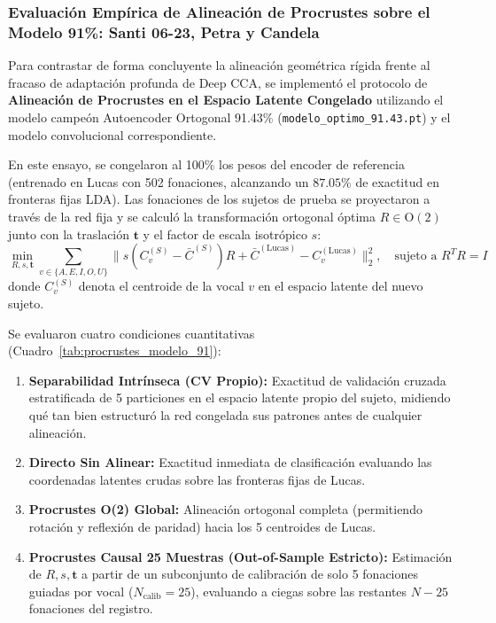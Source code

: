 \documentclass[11pt,a4paper]{article}
\begin{document}
\subsubsection{Evaluación Empírica de Alineación de Procrustes sobre el Modelo 91\%: Santi 06-23, Petra y Candela}
\label{subsubsec:evaluacion_procrustes_modelo_91}

Para contrastar de forma concluyente la alineación geométrica rígida frente al fracaso de adaptación profunda de Deep CCA, se implementó el protocolo de \textbf{Alineación de Procrustes en el Espacio Latente Congelado} utilizando el modelo campeón Autoencoder Ortogonal 91.43\% (\texttt{modelo\_optimo\_91.43.pt}) y el modelo convolucional correspondiente. 

En este ensayo, se congelaron al 100\% los pesos del encoder de referencia (entrenado en Lucas con 502 fonaciones, alcanzando un $87.05\%$ de exactitud en fronteras fijas LDA). Las fonaciones de los sujetos de prueba se proyectaron a través de la red fija y se calculó la transformación ortogonal óptima $R \in \text{O}(2)$ junto con la traslación $\mathbf{t}$ y el factor de escala isotrópico $s$:
\begin{equation}
    \min_{R, s, \mathbf{t}} \sum_{v \in \{A,E,I,O,U\}} \| s (C_v^{(S)} - \bar{C}^{(S)}) R + \bar{C}^{(\text{Lucas})} - C_v^{(\text{Lucas})} \|_2^2, \quad \text{sujeto a } R^T R = I
\end{equation}
donde $C_v^{(S)}$ denota el centroide de la vocal $v$ en el espacio latente del nuevo sujeto.

Se evaluaron cuatro condiciones cuantitativas (Cuadro~\ref{tab:procrustes_modelo_91}):
\begin{enumerate}
    \item \textbf{Separabilidad Intrínseca (CV Propio):} Exactitud de validación cruzada estratificada de 5 particiones en el espacio latente propio del sujeto, midiendo qué tan bien estructuró la red congelada sus patrones antes de cualquier alineación.
    \item \textbf{Directo Sin Alinear:} Exactitud inmediata de clasificación evaluando las coordenadas latentes crudas sobre las fronteras fijas de Lucas.
    \item \textbf{Procrustes O(2) Global:} Alineación ortogonal completa (permitiendo rotación y reflexión de paridad) hacia los 5 centroides de Lucas.
    \item \textbf{Procrustes Causal 25 Muestras (Out-of-Sample Estricto):} Estimación de $R, s, \mathbf{t}$ a partir de un subconjunto de calibración de solo 5 fonaciones guiadas por vocal ($N_{\text{calib}} = 25$), evaluando a ciegas sobre las restantes $N - 25$ fonaciones del registro.
\end{enumerate}
\end{document}
